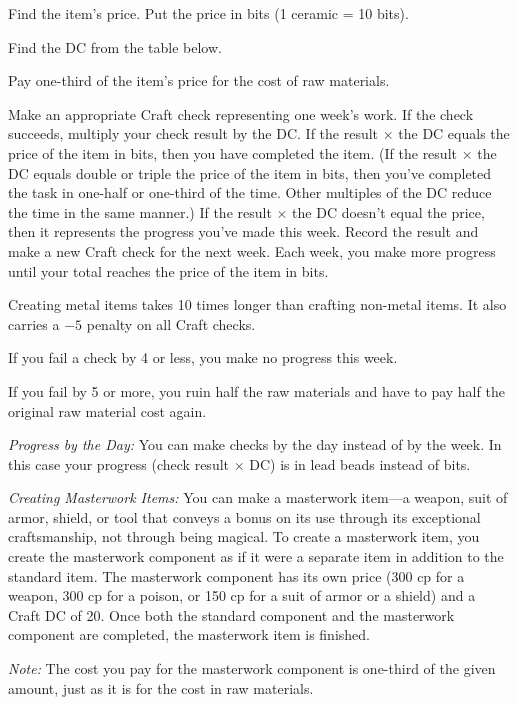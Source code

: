\begin{enumerate*}
\item Find the item's price. Put the price in bits (1 ceramic = 10 bits).
\item Find the DC from the table below.
\item Pay one-third of the item's price for the cost of raw materials.
\item Make an appropriate Craft check representing one week's work. If the check succeeds, multiply your check result by the DC. If the result $\times$ the DC equals the price of the item in bits, then you have completed the item. (If the result $\times$ the DC equals double or triple the price of the item in bits, then you've completed the task in one-half or one-third of the time. Other multiples of the DC reduce the time in the same manner.) If the result $\times$ the DC doesn't equal the price, then it represents the progress you've made this week. Record the result and make a new Craft check for the next week. Each week, you make more progress until your total reaches the price of the item in bits.
\end{enumerate*}

Creating metal items takes 10 times longer than crafting non-metal items. It also carries a $-5$ penalty on all Craft checks.

If you fail a check by 4 or less, you make no progress this week.

If you fail by 5 or more, you ruin half the raw materials and have to pay half the original raw material cost again.

\textit{Progress by the Day:} You can make checks by the day instead of by the week. In this case your progress (check result $\times$ DC) is in lead beads instead of bits.

\textit{Creating Masterwork Items:} You can make a masterwork item---a weapon, suit of armor, shield, or tool that conveys a bonus on its use through its exceptional craftsmanship, not through being magical. To create a masterwork item, you create the masterwork component as if it were a separate item in addition to the standard item. The masterwork component has its own price (300 cp for a weapon, 300 cp for a poison, or 150 cp for a suit of armor or a shield) and a Craft DC of 20. Once both the standard component and the masterwork component are completed, the masterwork item is finished.

\emph{Note:} The cost you pay for the masterwork component is one-third of the given amount, just as it is for the cost in raw materials.

